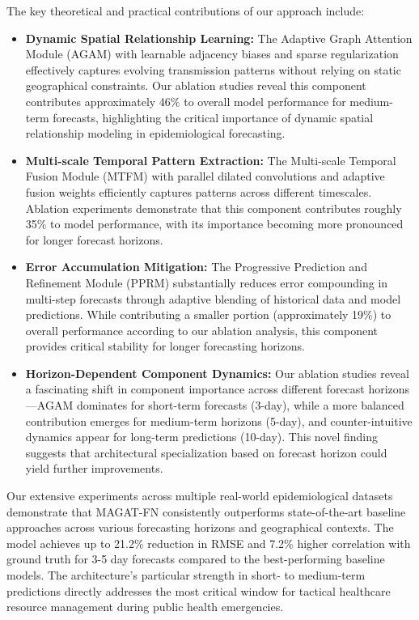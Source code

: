 \documentclass[lettersize, journal]{IEEEtran}
\begin{document}
The key theoretical and practical contributions of our approach include:
\begin{itemize}
    \item \textbf{Dynamic Spatial Relationship Learning:} The Adaptive Graph Attention Module (AGAM) with learnable adjacency biases and sparse regularization effectively captures evolving transmission patterns without relying on static geographical constraints. Our ablation studies reveal this component contributes approximately 46\% to overall model performance for medium-term forecasts, highlighting the critical importance of dynamic spatial relationship modeling in epidemiological forecasting.
    
    \item \textbf{Multi-scale Temporal Pattern Extraction:} The Multi-scale Temporal Fusion Module (MTFM) with parallel dilated convolutions and adaptive fusion weights efficiently captures patterns across different timescales. Ablation experiments demonstrate that this component contributes roughly 35\% to model performance, with its importance becoming more pronounced for longer forecast horizons.
    
    \item \textbf{Error Accumulation Mitigation:} The Progressive Prediction and Refinement Module (PPRM) substantially reduces error compounding in multi-step forecasts through adaptive blending of historical data and model predictions. While contributing a smaller portion (approximately 19\%) to overall performance according to our ablation analysis, this component provides critical stability for longer forecasting horizons.
    
    \item \textbf{Horizon-Dependent Component Dynamics:} Our ablation studies reveal a fascinating shift in component importance across different forecast horizons—AGAM dominates for short-term forecasts (3-day), while a more balanced contribution emerges for medium-term horizons (5-day), and counter-intuitive dynamics appear for long-term predictions (10-day). This novel finding suggests that architectural specialization based on forecast horizon could yield further improvements.
\end{itemize}

Our extensive experiments across multiple real-world epidemiological datasets demonstrate that MAGAT-FN consistently outperforms state-of-the-art baseline approaches across various forecasting horizons and geographical contexts. The model achieves up to 21.2\% reduction in RMSE and 7.2\% higher correlation with ground truth for 3-5 day forecasts compared to the best-performing baseline models. The architecture's particular strength in short- to medium-term predictions directly addresses the most critical window for tactical healthcare resource management during public health emergencies.
\end{document}
